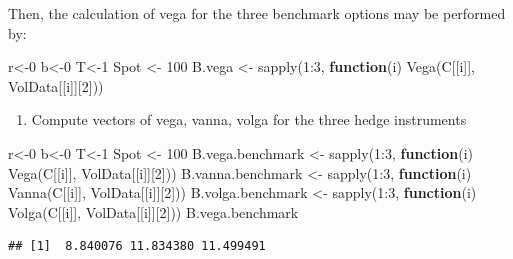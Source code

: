 \documentclass[
]{article}
\newenvironment{Shaded}{\begin{snugshade}}{\end{snugshade}}
\newcommand{\ControlFlowTok}[1]{\textcolor[rgb]{0.13,0.29,0.53}{\textbf{#1}}}
\newcommand{\DecValTok}[1]{\textcolor[rgb]{0.00,0.00,0.81}{#1}}
\newcommand{\FunctionTok}[1]{\textcolor[rgb]{0.00,0.00,0.00}{#1}}
\newcommand{\NormalTok}[1]{#1}
\newcommand{\OtherTok}[1]{\textcolor[rgb]{0.56,0.35,0.01}{#1}}
\newcommand{\SpecialCharTok}[1]{\textcolor[rgb]{0.00,0.00,0.00}{#1}}
\providecommand{\tightlist}{%
  \setlength{\itemsep}{0pt}\setlength{\parskip}{0pt}}
\begin{document}
Then, the calculation of vega for the three benchmark options may be
performed by:

\begin{Shaded}
\begin{Highlighting}[]
\NormalTok{r}\OtherTok{\textless{}{-}}\DecValTok{0}
\NormalTok{b}\OtherTok{\textless{}{-}}\DecValTok{0}
\NormalTok{T}\OtherTok{\textless{}{-}}\DecValTok{1}
\NormalTok{Spot }\OtherTok{\textless{}{-}} \DecValTok{100}
\NormalTok{B.vega }\OtherTok{\textless{}{-}} \FunctionTok{sapply}\NormalTok{(}\DecValTok{1}\SpecialCharTok{:}\DecValTok{3}\NormalTok{, }\ControlFlowTok{function}\NormalTok{(i) }\FunctionTok{Vega}\NormalTok{(C[[i]], VolData[[i]][}\DecValTok{2}\NormalTok{]))}
\end{Highlighting}
\end{Shaded}

\begin{enumerate}
\def\labelenumi{\arabic{enumi}.}
\setcounter{enumi}{1}
\tightlist
\item
  Compute vectors of vega, vanna, volga for the three hedge instruments
\end{enumerate}

\begin{Shaded}
\begin{Highlighting}[]
\NormalTok{r}\OtherTok{\textless{}{-}}\DecValTok{0}
\NormalTok{b}\OtherTok{\textless{}{-}}\DecValTok{0}
\NormalTok{T}\OtherTok{\textless{}{-}}\DecValTok{1}
\NormalTok{Spot }\OtherTok{\textless{}{-}} \DecValTok{100}
\NormalTok{B.vega.benchmark }\OtherTok{\textless{}{-}} \FunctionTok{sapply}\NormalTok{(}\DecValTok{1}\SpecialCharTok{:}\DecValTok{3}\NormalTok{, }\ControlFlowTok{function}\NormalTok{(i) }\FunctionTok{Vega}\NormalTok{(C[[i]], VolData[[i]][}\DecValTok{2}\NormalTok{]))}
\NormalTok{B.vanna.benchmark }\OtherTok{\textless{}{-}} \FunctionTok{sapply}\NormalTok{(}\DecValTok{1}\SpecialCharTok{:}\DecValTok{3}\NormalTok{, }\ControlFlowTok{function}\NormalTok{(i) }\FunctionTok{Vanna}\NormalTok{(C[[i]], VolData[[i]][}\DecValTok{2}\NormalTok{]))}
\NormalTok{B.volga.benchmark }\OtherTok{\textless{}{-}} \FunctionTok{sapply}\NormalTok{(}\DecValTok{1}\SpecialCharTok{:}\DecValTok{3}\NormalTok{, }\ControlFlowTok{function}\NormalTok{(i) }\FunctionTok{Volga}\NormalTok{(C[[i]], VolData[[i]][}\DecValTok{2}\NormalTok{]))}
\NormalTok{B.vega.benchmark}
\end{Highlighting}
\end{Shaded}

\begin{verbatim}
## [1]  8.840076 11.834380 11.499491
\end{verbatim}
\end{document}
